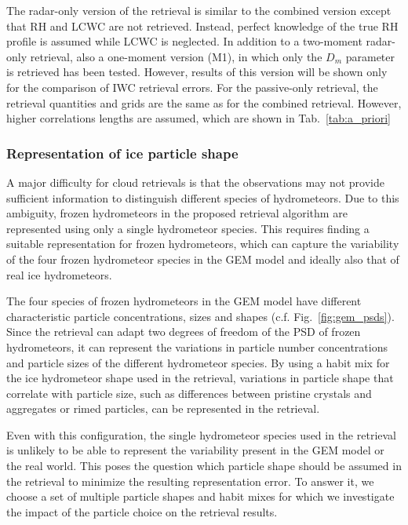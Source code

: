 \documentclass[journal abbreviation, manuscript]{copernicus}
\begin{document}
The radar-only version of the retrieval is similar to the combined version
except that RH and LCWC are not retrieved. Instead, perfect knowledge of the
true RH profile is assumed while LCWC is neglected. In addition to a two-moment
radar-only retrieval, also a one-moment version (M1), in which only the $D_m$
parameter is retrieved has been tested. However, results of this version will be
shown only for the comparison of IWC retrieval errors. For the passive-only
retrieval, the retrieval quantities and grids are the same as for the combined
retrieval. However, higher correlations lengths are assumed, which are shown in
Tab.~\ref{tab:a_priori}

\subsubsection{Representation of ice particle shape}
\label{sec:method:partilce_models}

A major difficulty for cloud retrievals is that the observations may not provide
sufficient information to distinguish different species of hydrometeors. Due to
this ambiguity, frozen hydrometeors in the proposed retrieval algorithm are
represented using only a single hydrometeor species. This requires finding a
suitable representation for frozen hydrometeors, which can capture the
variability of the four frozen hydrometeor species in the GEM model and ideally
also that of real ice hydrometeors.

The four species of frozen hydrometeors in the GEM model have different
characteristic particle concentrations, sizes and shapes (c.f.
Fig.~\ref{fig:gem_psds}). Since the retrieval can adapt two degrees of freedom
of the PSD of frozen hydrometeors, it can represent the variations in particle
number concentrations and particle sizes of the different hydrometeor species.
By using a habit mix for the ice hydrometeor shape used in the retrieval,
variations in particle shape that correlate with particle size, such as
differences between pristine crystals and aggregates or rimed particles, can
be represented in the retrieval.

Even with this configuration, the single hydrometeor species used in the
retrieval is unlikely to be able to represent the variability present in the GEM
model or the real world. This poses the question which particle shape should be
assumed in the retrieval to minimize the resulting representation error. To
answer it, we choose a set of multiple particle shapes and habit mixes for which
we investigate the impact of the particle choice on the retrieval results.
\end{document}
